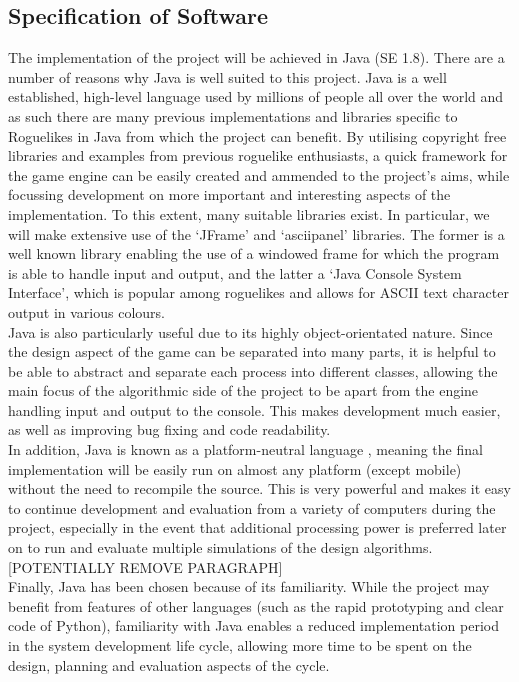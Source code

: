 \documentclass[12pt,a4paper]{article}
\begin{document}
\subsection{Specification of Software}

The implementation of the project will be achieved in Java (SE 1.8). There are a number of reasons why Java is well suited to this project. Java is a well established, high-level language used by millions of people all over the world and as such there are many previous implementations and libraries specific to Roguelikes in Java from which the project can benefit. By utilising copyright free libraries and examples from previous roguelike enthusiasts, a quick framework for the game engine can be easily created and ammended to the project's aims, while focussing development on more important and interesting aspects of the implementation. To this extent, many suitable libraries exist. In particular, we will make extensive use of the `JFrame' and `asciipanel' libraries. The former is a well known library enabling the use of a windowed frame for which the program is able to handle input and output, and the latter a `Java Console System Interface', which is popular among roguelikes and allows for ASCII text character output in various colours. \\

Java is also particularly useful due to its highly object-orientated nature. Since the design aspect of the game can be separated into many parts, it is helpful to be able to abstract and separate each process into different classes, allowing the main focus of the algorithmic side of the project to be apart from the engine handling input and output to the console. This makes development much easier, as well as improving bug fixing and code readability.\\

In addition, Java is known as a platform-neutral language \cite{java}, meaning the final implementation will be easily run on almost any platform (except mobile) without the need to recompile the source. This is very powerful and makes it easy to continue development and evaluation from a variety of computers during the project, especially in the event that additional processing power is preferred later on to run and evaluate multiple simulations of the design algorithms. [POTENTIALLY REMOVE PARAGRAPH] \\

Finally, Java has been chosen because of its familiarity. While the project may benefit from features of other languages (such as the rapid prototyping and clear code of Python), familiarity with Java enables a reduced implementation period in the system development life cycle, allowing more time to be spent on the design, planning and evaluation aspects of the cycle. 
\\
\end{document}
